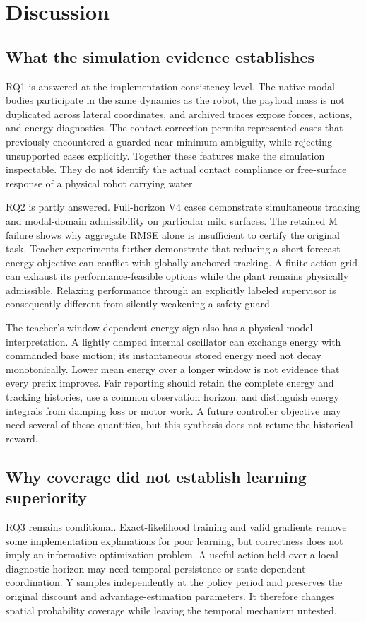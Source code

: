 \section{Discussion}
\subsection{What the simulation evidence establishes}
RQ1 is answered at the implementation-consistency level. The native modal bodies participate in the same dynamics as the robot, the payload mass is not duplicated across lateral coordinates, and archived traces expose forces, actions, and energy diagnostics. The contact correction permits represented cases that previously encountered a guarded near-minimum ambiguity, while rejecting unsupported cases explicitly. Together these features make the simulation inspectable. They do not identify the actual contact compliance or free-surface response of a physical robot carrying water.

RQ2 is partly answered. Full-horizon V4 cases demonstrate simultaneous tracking and modal-domain admissibility on particular mild surfaces. The retained M failure shows why aggregate RMSE alone is insufficient to certify the original task. Teacher experiments further demonstrate that reducing a short forecast energy objective can conflict with globally anchored tracking. A finite action grid can exhaust its performance-feasible options while the plant remains physically admissible. Relaxing performance through an explicitly labeled supervisor is consequently different from silently weakening a safety guard.

The teacher's window-dependent energy sign also has a physical-model interpretation. A lightly damped internal oscillator can exchange energy with commanded base motion; its instantaneous stored energy need not decay monotonically. Lower mean energy over a longer window is not evidence that every prefix improves. Fair reporting should retain the complete energy and tracking histories, use a common observation horizon, and distinguish energy integrals from damping loss or motor work. A future controller objective may need several of these quantities, but this synthesis does not retune the historical reward.

\subsection{Why coverage did not establish learning superiority}
RQ3 remains conditional. Exact-likelihood training and valid gradients remove some implementation explanations for poor learning, but correctness does not imply an informative optimization problem. A useful action held over a local diagnostic horizon may need temporal persistence or state-dependent coordination. Y samples independently at the policy period and preserves the original discount and advantage-estimation parameters. It therefore changes spatial probability coverage while leaving the temporal mechanism untested.

